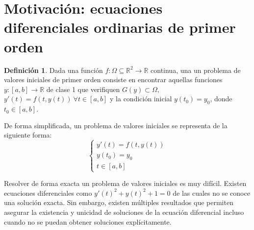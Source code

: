 \documentclass{article}
\theoremstyle{theorem-style}  %
\theoremstyle{definition}
\newtheorem{definition}{Definición}[section]
\theoremstyle{example-style}
\begin{document}
\maketitle



\newpage
\tableofcontents
\newpage


\section{Motivación: ecuaciones diferenciales ordinarias de primer orden} \label{sec:motivacion}

	\begin{definition} 
		Dada una función $f:\Omega \subseteq \mathbb R^2  \to \mathbb{R}$ continua, una un problema de valores iniciales de primer orden consiste en encontrar aquellas funciones $y: [a,b] \rightarrow \mathbb{R}$ de clase 1 que verifiquen $G(y) \subset \Omega$, $y'(t) = f(t,y(t)) \ \forall t \in [a,b]$ y la condición inicial $y(t_0) = y_0$, donde $t_0 \in [a,b]$.  
	\end{definition}

	De forma simplificada, un problema de valores iniciales se representa de la siguiente forma: 
	\begin{equation*}
		\begin{cases}
			y'(t) = f(t,y(t)) \\
			y(t_0) = y_0 \\
			t \in [a,b]
		\end{cases}
	\end{equation*}

	Resolver de forma exacta un problema de valores iniciales es muy difícil. Existen ecuaciones diferenciales como $y'(t)^2 + y(t)^2 + 1 = 0$ de las cuales no se conoce una solución exacta. Sin embargo, existen múltiples resultados que permiten asegurar la existencia y unicidad de soluciones de la ecuación diferencial incluso cuando no se puedan obtener soluciones explícitamente.
\end{document}
